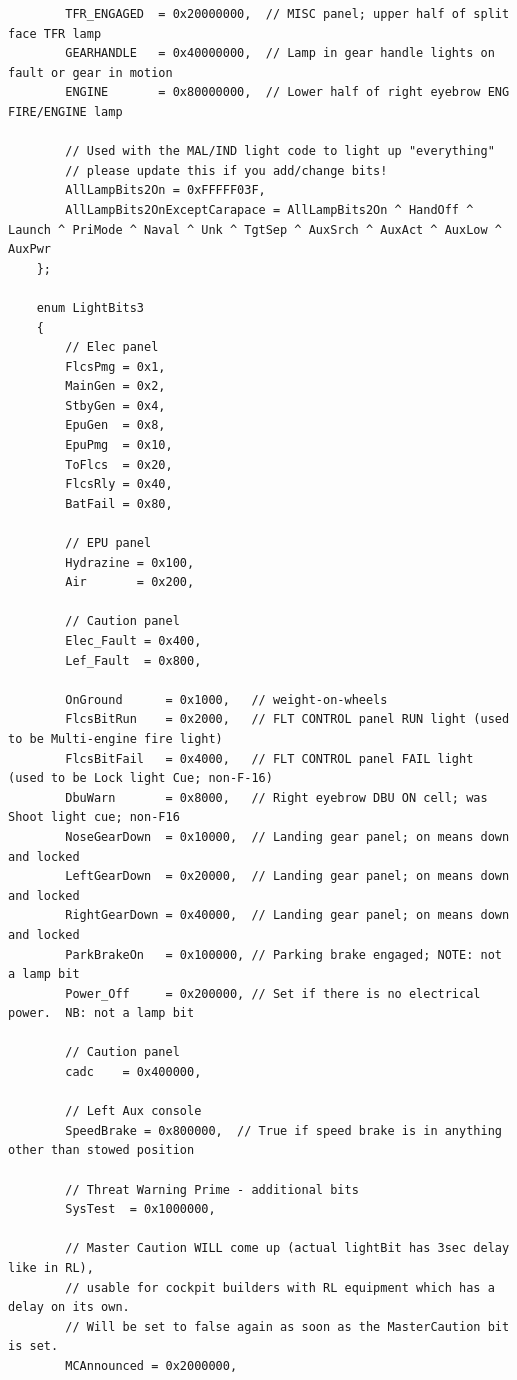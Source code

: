 \documentclass[11pt,letterpaper,titlepage]{article}
\begin{document}
\begin{landscape}
\begin{lstlisting}
        TFR_ENGAGED  = 0x20000000,  // MISC panel; upper half of split face TFR lamp
        GEARHANDLE   = 0x40000000,  // Lamp in gear handle lights on fault or gear in motion
        ENGINE       = 0x80000000,  // Lower half of right eyebrow ENG FIRE/ENGINE lamp

        // Used with the MAL/IND light code to light up "everything"
        // please update this if you add/change bits!
		AllLampBits2On = 0xFFFFF03F,
		AllLampBits2OnExceptCarapace = AllLampBits2On ^ HandOff ^ Launch ^ PriMode ^ Naval ^ Unk ^ TgtSep ^ AuxSrch ^ AuxAct ^ AuxLow ^ AuxPwr
    };

    enum LightBits3
    {
        // Elec panel
        FlcsPmg = 0x1,
        MainGen = 0x2,
        StbyGen = 0x4,
        EpuGen  = 0x8,
        EpuPmg  = 0x10,
        ToFlcs  = 0x20,
        FlcsRly = 0x40,
        BatFail = 0x80,

        // EPU panel
        Hydrazine = 0x100,
        Air       = 0x200,

        // Caution panel
        Elec_Fault = 0x400,
        Lef_Fault  = 0x800,

		OnGround	  = 0x1000,   // weight-on-wheels
        FlcsBitRun    = 0x2000,   // FLT CONTROL panel RUN light (used to be Multi-engine fire light)
        FlcsBitFail   = 0x4000,   // FLT CONTROL panel FAIL light (used to be Lock light Cue; non-F-16)
        DbuWarn       = 0x8000,   // Right eyebrow DBU ON cell; was Shoot light cue; non-F16
        NoseGearDown  = 0x10000,  // Landing gear panel; on means down and locked
        LeftGearDown  = 0x20000,  // Landing gear panel; on means down and locked
        RightGearDown = 0x40000,  // Landing gear panel; on means down and locked
		ParkBrakeOn   = 0x100000, // Parking brake engaged; NOTE: not a lamp bit
        Power_Off     = 0x200000, // Set if there is no electrical power.  NB: not a lamp bit

		// Caution panel
		cadc	= 0x400000,
		
		// Left Aux console
		SpeedBrake = 0x800000,  // True if speed brake is in anything other than stowed position

        // Threat Warning Prime - additional bits
		SysTest  = 0x1000000,

		// Master Caution WILL come up (actual lightBit has 3sec delay like in RL),
		// usable for cockpit builders with RL equipment which has a delay on its own.
		// Will be set to false again as soon as the MasterCaution bit is set.
		MCAnnounced = 0x2000000,


\end{lstlisting}
\end{landscape}
\end{document}
